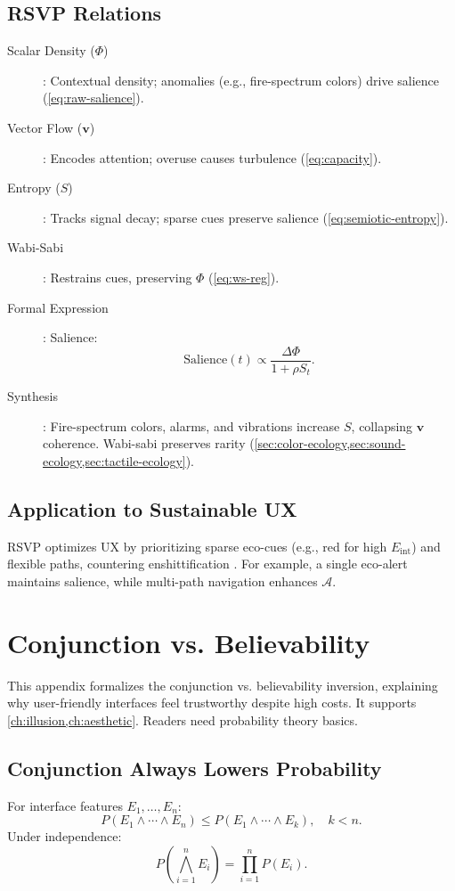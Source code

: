 \documentclass[openany]{book}
\newcommand{\PhiS}{\Phi} %
\newcommand{\vvec}{\mathbf{v}} %
\newcommand{\Sent}{S} %
\newcommand{\Eint}{E_{\mathrm{int}}} %
\newcommand{\Auton}{\mathcal{A}} %
\begin{document}
{{\section{RSVP Relations}
\label{sec:rsvp-relations}
\begin{description}
  \item[Scalar Density (\(\PhiS\))]: Contextual density; anomalies (e.g., fire-spectrum colors) drive salience (\cref{eq:raw-salience}).
  \item[Vector Flow (\(\vvec\))]: Encodes attention; overuse causes turbulence (\cref{eq:capacity}).
  \item[Entropy (\(\Sent\))]: Tracks signal decay; sparse cues preserve salience (\cref{eq:semiotic-entropy}).
  \item[Wabi-Sabi]: Restrains cues, preserving \(\PhiS\) (\cref{eq:ws-reg}).
  \item[Formal Expression]: Salience:
  \begin{equation}
  \label{eq:salience}
  \text{Salience}(t) \propto \frac{\Delta \PhiS}{1 + \rho \Sent_t}.
  \end{equation}
  \item[Synthesis]: Fire-spectrum colors, alarms, and vibrations increase \(\Sent\), collapsing \(\vvec\) coherence. Wabi-sabi preserves rarity (\cref{sec:color-ecology,sec:sound-ecology,sec:tactile-ecology}).
\end{description}

\section{Application to Sustainable UX}
\label{sec:rsvp-application}
RSVP optimizes UX by prioritizing sparse eco-cues (e.g., red for high \(\Eint\)) and flexible paths, countering enshittification \citep{doctorow2022}. For example, a single eco-alert maintains salience, while multi-path navigation enhances \(\Auton\).

\chapter{Conjunction vs. Believability}
\label{app:conjunction}

This appendix formalizes the conjunction vs. believability inversion, explaining why user-friendly interfaces feel trustworthy despite high costs. It supports \cref{ch:illusion,ch:aesthetic}. Readers need probability theory basics.

\section{Conjunction Always Lowers Probability}
\label{sec:conj-prob}
For interface features \(E_1, \dots, E_n\):
\begin{equation}
\label{eq:conj-prob}
P(E_1 \land \cdots \land E_n) \leq P(E_1 \land \cdots \land E_k), \quad k < n.
\end{equation}
Under independence:
\begin{equation}
\label{eq:conj-indep}
P\!\left(\bigwedge_{i=1}^n E_i\right) = \prod_{i=1}^n P(E_i).
\end{equation}

}}
\end{document}
